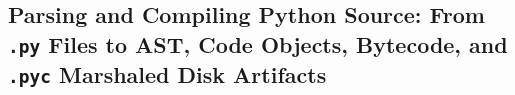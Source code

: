 \subsection{Parsing and Compiling Python Source: From \texttt{.py} Files to AST, Code Objects, Bytecode, and \texttt{.pyc} Marshaled Disk Artifacts}
